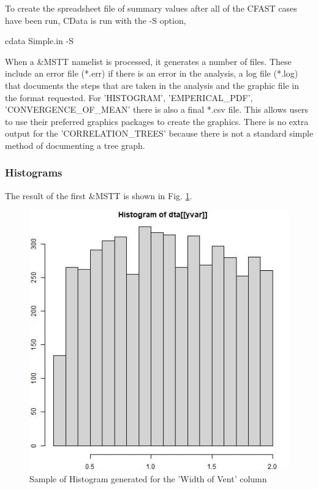 \documentclass[12pt,twoside]{book}
\begin{document}
To create the spreadsheet file of summary values after all of the CFAST cases have been run, CData is run with the {\ct -S} option,

\vspace{\baselineskip}
{\ct cdata Simple.in -S}
\vspace{\baselineskip}

When a {\ct \&MSTT} namelist is processed, it generates a number of files. These include an error file (*.err) if there is an error in the analysis, a log file (*.log) that documents the steps that are taken in the analysis and the graphic file in the format requested. For {\ct 'HISTOGRAM'}, {\ct 'EMPERICAL\_PDF'}, {\ct 'CONVERGENCE\_OF\_MEAN'} there is also a final *.csv file. This allows users to use their preferred graphics packages to create the graphics. There is no extra output for the {\ct 'CORRELATION\_TREES'} because there is not a standard simple method of documenting a tree graph.

\subsubsection{Histograms}

The result of the first {\ct \&MSTT} is shown in Fig. \ref{simple_width_hist}.

\begin{figure}[h!]
\centering
\includegraphics[width=4.5in]{FIGURES/simple_width.jpeg}
\caption{Sample of Histogram generated for the 'Width of Vent' column}
\label{simple_width_hist}
\end{figure}
\end{document}
